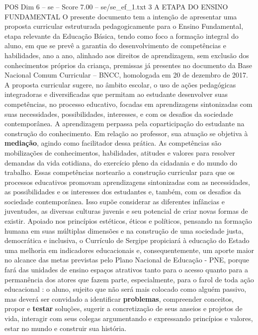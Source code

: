 \begin{textsample}{POS Dim 6 – se – Score 7.00 – se/se\_ef\_1.txt}  \label{ex:f6_pos_047}
3 A ETAPA DO ENSINO FUNDAMENTAL O presente documento tem a intenção de apresentar uma proposta curricular estruturada pedagogicamente para o Ensino Fundamental, etapa relevante da Educação Básica, tendo como foco a formação integral do aluno, em que se prevê a garantia do desenvolvimento de competências e habilidades, ano a ano, alinhado aos direitos de aprendizagem, sem exclusão dos conhecimentos próprios da criança, premissas já presentes no documento da Base Nacional Comum Curricular – BNCC, homologada em 20 de dezembro de 2017.
A proposta curricular sugere, no âmbito escolar, o uso de ações pedagógicas integradoras e diversificadas que permitam ao estudante desenvolver suas competências, no processo educativo, focadas em aprendizagens sintonizadas com suas necessidades, possibilidades, interesses, e com os desafios da sociedade contemporânea.
A aprendizagem perpassa pela coparticipação do estudante na construção do conhecimento.
Em relação ao professor, sua atuação se objetiva à \textbf{mediação}, agindo como facilitador dessa prática.
As competências são mobilizações de conhecimentos, habilidades, atitudes e valores para resolver demandas da vida cotidiana, do exercício pleno da cidadania e do mundo do trabalho.
Essas competências nortearão a construção curricular para que os processos educativos promovam aprendizagens sintonizadas com as necessidades, as possibilidades e os interesses dos estudantes e, também, com os desafios da sociedade contemporânea.
Isso supõe considerar as diferentes infâncias e juventudes, as diversas culturas juvenis e seu potencial de criar novas formas de existir.
Apoiado nos princípios estéticos, éticos e políticos, pensando na formação humana em suas múltiplas dimensões e na construção de uma sociedade justa, democrática e inclusiva, o Currículo de Sergipe propiciará à educação do Estado uma melhoria em indicadores educacionais e, consequentemente, um aporte maior no alcance das metas previstas pelo Plano Nacional de Educação - PNE, porque fará das unidades de ensino espaços atrativos tanto para o acesso quanto para a permanência dos atores que fazem parte, especialmente, para o farol de toda ação educacional : o aluno, sujeito que não será mais colocado como alguém passivo, mas deverá ser convidado a identificar \textbf{problemas}, compreender conceitos, propor e \textbf{testar} soluções, sugerir a concretização de seus anseios e projetos de vida, interagir com seus colegas argumentando e expressando princípios e valores, estar no mundo e construir sua história.

\end{textsample}
